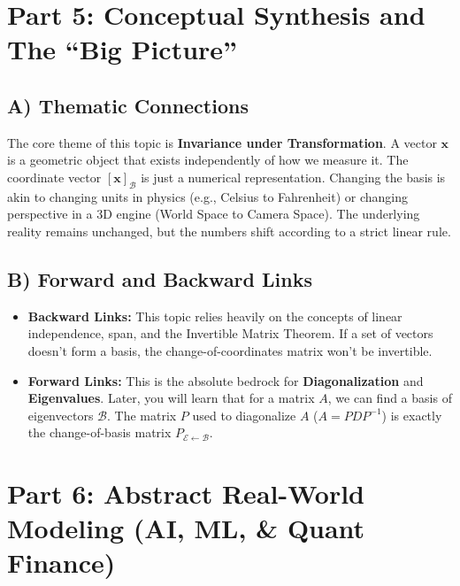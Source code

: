 \documentclass[11pt]{article}
\begin{document}
\section{Part 5: Conceptual Synthesis and The ``Big Picture''}

\subsection{A) Thematic Connections}
The core theme of this topic is \textbf{Invariance under Transformation}. A vector $\mathbf{x}$ is a geometric object that exists independently of how we measure it. The coordinate vector $[\mathbf{x}]_{\mathcal{B}}$ is just a numerical representation. Changing the basis is akin to changing units in physics (e.g., Celsius to Fahrenheit) or changing perspective in a 3D engine (World Space to Camera Space). The underlying reality remains unchanged, but the numbers shift according to a strict linear rule.

\subsection{B) Forward and Backward Links}
\begin{itemize}
    \item \textbf{Backward Links:} This topic relies heavily on the concepts of linear independence, span, and the Invertible Matrix Theorem. If a set of vectors doesn't form a basis, the change-of-coordinates matrix won't be invertible.
    \item \textbf{Forward Links:} This is the absolute bedrock for \textbf{Diagonalization} and \textbf{Eigenvalues}. Later, you will learn that for a matrix $A$, we can find a basis of eigenvectors $\mathcal{B}$. The matrix $P$ used to diagonalize $A$ ($A = PDP^{-1}$) is exactly the change-of-basis matrix $P_{\mathcal{E} \leftarrow \mathcal{B}}$.
\end{itemize}

\section{Part 6: Abstract Real-World Modeling (AI, ML, \& Quant Finance)}
\end{document}
